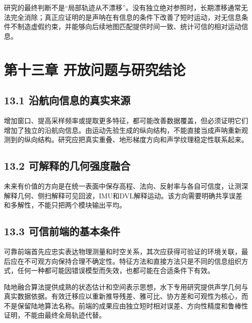 研究的最终判断不是``局部轨迹从不漂移''。没有独立绝对参照时，长期漂移通常无法完全消除；真正应证明的是声呐在有信息的条件下改善了短时运动，对无信息条件不制造虚假约束，并能够向后续地图匹配提供时间一致、统计可信的相对运动信息。

\hypertarget{ux7b2cux5341ux4e09ux7ae0-ux5f00ux653eux95eeux9898ux4e0eux7814ux7a76ux7ed3ux8bba}{%
\section{第十三章 开放问题与研究结论}\label{ux7b2cux5341ux4e09ux7ae0-ux5f00ux653eux95eeux9898ux4e0eux7814ux7a76ux7ed3ux8bba}}

\hypertarget{ux6cbfux822aux5411ux4fe1ux606fux7684ux771fux5b9eux6765ux6e90}{%
\subsection{13.1 沿航向信息的真实来源}\label{ux6cbfux822aux5411ux4fe1ux606fux7684ux771fux5b9eux6765ux6e90}}

增加窗口、提高采样频率或提取更多特征，都可能改善数据覆盖，但必须证明它们增加了独立的沿航向信息。由运动先验生成的纵向结构，不能直接当成声呐重新观测到的纵向结构。研究应把真实重叠、地形梯度方向和声学纹理稳定性联系起来。

\hypertarget{ux53efux89e3ux91caux7684ux51e0ux4f55ux5f3aux5ea6ux878dux5408}{%
\subsection{13.2 可解释的几何强度融合}\label{ux53efux89e3ux91caux7684ux51e0ux4f55ux5f3aux5ea6ux878dux5408}}

未来有价值的方向是在统一表面中保存高程、法向、反射率与各自可信度，让测深解释几何、侧扫解释可见回波，IMU和DVL解释运动。该方向需要明确共享误差和多解性，不能只把两个模块输出平均。

\hypertarget{ux53efux4fe1ux524dux7aefux7684ux57faux672cux6761ux4ef6}{%
\subsection{13.3 可信前端的基本条件}\label{ux53efux4fe1ux524dux7aefux7684ux57faux672cux6761ux4ef6}}

可靠前端首先应忠实表达物理测量和时空关系，其次应获得可验证的环境关联，最后应在不可观方向保持合理不确定性。特征方法和直接方法只是不同的信息组织方式，任何一种都可能因错误模型而失效，也都可能在合适条件下有效。

陆地融合算法提供成熟的状态估计和空间表示思想，水下专用研究提供声学几何与真实数据依据。有效迁移应以重新推导残差、雅可比、协方差和可观性为核心，而不是保留陆地算法名称。前端的成果应由独立短时相对误差、方向性精度和鲁棒性证明，不能由最终全局轨迹代替。

